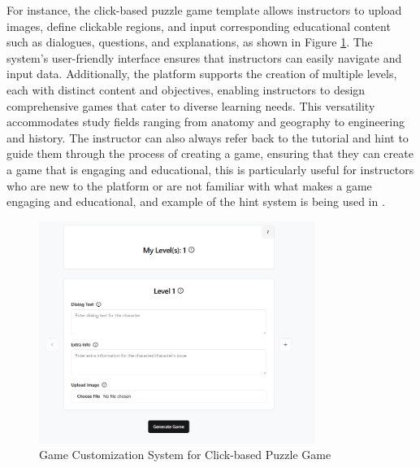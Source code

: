 For instance, the click-based puzzle game template allows instructors to upload images, define clickable regions, and input corresponding educational content such as dialogues, questions, and explanations, as shown in Figure \ref{fig:customizationClickPuzzle}. The system’s user-friendly interface ensures that instructors can easily navigate and input data. Additionally, the platform supports the creation of multiple levels, each with distinct content and objectives, enabling instructors to design comprehensive games that cater to diverse learning needs. This versatility accommodates study fields ranging from anatomy and geography to engineering and history. The instructor can also always refer back to the tutorial and hint to guide them through the process of creating a game, ensuring that they can create a game that is engaging and educational, this is particularly useful for instructors who are new to the platform or are not familiar with what makes a game engaging and educational, and example of the hint system is being used in .

\begin{figure}
	\centering
	\includegraphics[width=0.8\textwidth]{figures/Diagnose_Game/Instructor_Portal_Diagnose_Game.png}
	\caption{Game Customization System for Click-based Puzzle Game}
	\label{fig:customizationClickPuzzle}
\end{figure}

